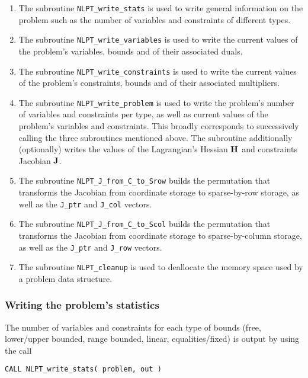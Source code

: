 \documentclass{galahad}
\newcommand{\packagename}{NLPT}
\begin{document}
\begin{enumerate}
\item The subroutine {\tt \packagename\_write\_stats}
      is used to write general information on the problem such
      as the number of variables and constraints of different types.
\item The subroutine {\tt \packagename\_write\_variables}
      is used to write the current values of the problem's variables, bounds
      and of their associated duals.
\item The subroutine {\tt \packagename\_write\_constraints}
      is used to write the current values of the problem's constraints, bounds
      and of their associated multipliers.
\item The subroutine {\tt \packagename\_write\_problem}
      is used to write the problem's number of variables and
      constraints per type, as well as current values of the problem's
      variables and constraints. This broadly corresponds to successively
      calling the three subroutines mentioned above. The subroutine
      additionally (optionally) writes the values of the Lagrangian's Hessian
      ${\mathbf{H}}$ and constraints Jacobian ${\mathbf{J}}$.
\item The subroutine {\tt \packagename\_J\_from\_C\_to\_Srow}
      builds the permutation that transforms the Jacobian from
      coordinate storage to sparse-by-row storage, as well as the
      {\tt J\_ptr} and {\tt J\_col} vectors.
\item The subroutine {\tt \packagename\_J\_from\_C\_to\_Scol}
      builds the permutation that transforms the Jacobian from
      coordinate storage to sparse-by-column storage, as well as the
      {\tt J\_ptr} and {\tt J\_row} vectors.
\item The subroutine {\tt \packagename\_cleanup} is used to deallocate
      the memory space used by a problem data structure.
\end{enumerate}

\subsubsection{Writing the problem's statistics}\label{w_stats}

The number of variables and constraints for each type of bounds (free,
lower/upper bounded, range bounded, linear, equalities/fixed) is output
by using the call
\vspace*{1mm}

\hspace{8mm}
{\tt CALL \packagename\_write\_stats( problem, out )}
\end{document}
